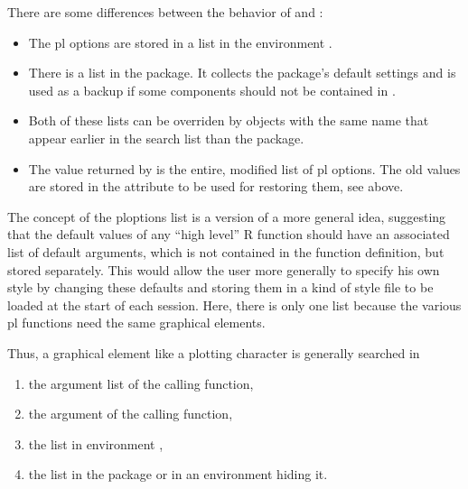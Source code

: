 \documentclass[11pt]{article}\usepackage[]{graphicx}\usepackage[]{color}
\begin{document}
There are some differences between the behavior of  and :
\begin{itemize}
\item 
  The pl options are stored in a list  in the environment
  .
\item
  There is a list  in the package. It collects the
  package's default settings and is used as a backup if some components should
  not be contained in .
\item
  Both of these lists can be overriden by objects with the same name
  that appear earlier in the search list than the  package.
\item
  The value returned by  is the entire, modified list of 
  pl options. The old values are stored in the attribute 
  to be used for restoring them, see above.
\end{itemize}

\Remark
The concept of the ploptions list is a version of a more general idea, 
suggesting that the default values of any ``high level'' R function should 
have an associated list of default arguments, which is not contained in 
the function definition, but stored separately. 
This would allow the user more generally to specify his own style by 
changing these defaults and storing them in a kind of style file to be 
loaded at the start of each session. 
Here, there is only one list because the various pl functions need the 
same graphical elements.

Thus, a graphical element like a plotting character is generally searched 
in
\begin{enumerate}
\item 
  the argument list of the calling function,
\item
  the  argument of the calling function,
\item
  the  list in environment ,
\item
  the list  in the package 
  or in an environment hiding it.
\end{enumerate}
\end{document}
